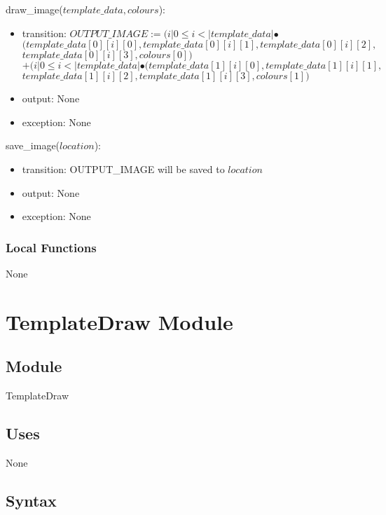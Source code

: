 \documentclass[12pt, titlepage]{article}
\begin{document}
\hspace{-18pt}draw\_image($template\_data, colours$):
\begin{itemize}
\item transition: $OUTPUT\_IMAGE := (i | 0 \leq i < |template\_data| \bullet$ \\ $(template\_data[0][i][0], template\_data[0][i][1], template\_data[0][i][2],$ \\ $ template\_data[0][i][3], colours[0])$ \\ $ +  (i | 0 \leq i < |template\_data| \bullet (template\_data[1][i][0], template\_data[1][i][1],$ \\ $ template\_data[1][i][2], template\_data[1][i][3], colours[1])$
\item output: None
\item exception: None
\end{itemize}


\hspace{-18pt}save\_image($location$):
\begin{itemize}
\item transition: OUTPUT\_IMAGE will be saved to $location$
\item output: None
\item exception: None
\end{itemize}

\subsubsection*{Local Functions}

None

\newpage

\section* {TemplateDraw Module}

\subsection*{Module}

TemplateDraw

\subsection* {Uses}

None

\subsection* {Syntax}
\end{document}
